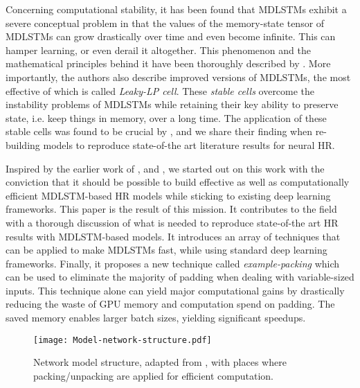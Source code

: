 \documentclass[conference]{IEEEtran}
\renewcommand{\ac}[1]{\gls{#1}}
\renewcommand{\acp}[1]{\glspl{#1}}
\begin{document}
Concerning computational stability, it has been found that \acp{MDLSTM} exhibit a severe conceptual problem in that the values of the memory-state tensor of 
\acp{MDLSTM} can grow drastically over time and even become infinite. This can hamper learning, or even derail it altogether. 
This phenomenon and the mathematical principles behind it have been thoroughly described by \cite{LeifertEtAl2014}. More importantly, 
the authors also describe improved versions of \acp{MDLSTM}, the most effective of which is called \emph{Leaky-LP cell}. These \emph{stable cells} overcome 
the instability problems of \acp{MDLSTM} while retaining their key ability to preserve state, i.e. keep things in memory, over a long time. The application of 
these stable cells was found to be crucial by \cite{Voigtlaender2016}, and we share their finding when re-building models to reproduce state-of-the art 
literature results for neural \ac{HR}.

Inspired by the earlier work of  \cite{PhamEtAl2014}, \cite{Voigtlaender2016}
and \cite{VanDenOord:2016:PixelRecurrentNeuralNetworks}, we started out on this work with the conviction that it should be possible 
to build effective as well as computationally efficient \ac{MDLSTM}-based \ac{HR} models while sticking to existing deep learning frameworks. 
This paper is the result of this mission. It contributes 
to the field with a thorough discussion of what is needed to reproduce state-of-the art \ac{HR} results with \ac{MDLSTM}-based models. 
It introduces an array of techniques that can be applied to make \acp{MDLSTM} fast, while using standard deep learning frameworks. Finally, it proposes 
a new technique called \emph{example-packing} which can be used to eliminate the majority of padding when dealing with variable-sized inputs. This technique 
alone can yield major computational gains by drastically reducing the waste of GPU memory and computation spend on padding. The saved memory enables larger 
batch sizes, yielding significant speedups. 



\begin{figure*}[h!]
\begin{center}
  \texttt{[image: Model-network-structure.pdf]}
\end{center}
\caption{Network model structure, adapted from \cite{PhamEtAl2014}, with places where packing/unpacking are applied for efficient computation.}
\label{figure:network-model-structure}
\end{figure*}
\end{document}
